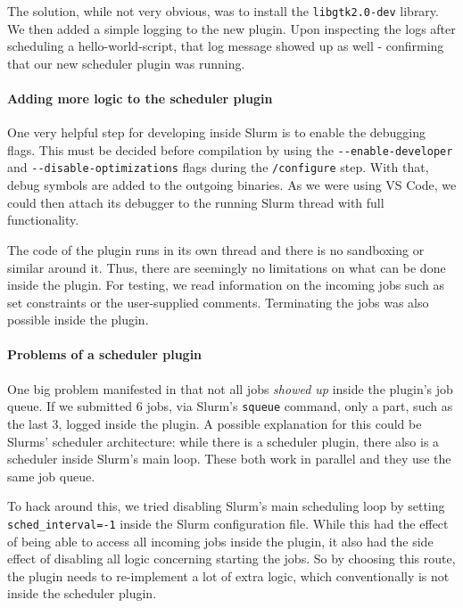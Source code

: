 The solution, while not very obvious, was to install the \verb|libgtk2.0-dev| library.
We then added a simple logging to the new plugin. Upon inspecting the logs after scheduling a hello-world-script, that log message showed up as well - confirming that our new scheduler plugin was running.

\paragraph{Adding more logic to the scheduler plugin}

One very helpful step for developing inside Slurm is to enable the debugging flags.
This must be decided before compilation by using the \verb|--enable-developer| and \verb|--disable-optimizations| flags during the \verb|/configure| step. 
With that, debug symbols are added to the outgoing binaries. 
As we were using VS Code, we could then attach its debugger to the running Slurm thread with full functionality.

The code of the plugin runs in its own thread and there is no sandboxing or similar around it.
Thus, there are seemingly no limitations on what can be done inside the plugin. 
For testing, we read information on the incoming jobs such as set constraints or the user-supplied comments. Terminating the jobs was also possible inside the plugin.

\paragraph{Problems of a scheduler plugin}

One big problem manifested in that not all jobs \emph{showed up} inside the plugin's job queue. 
If we submitted 6 jobs, via Slurm's \verb|squeue| command, only a part, such as the last 3, logged inside the plugin.
A possible explanation for this could be Slurms' scheduler architecture: while there is a scheduler plugin, there also is a scheduler inside Slurm's main loop. These both work in parallel and they use the same job queue.

To hack around this, we tried disabling Slurm's main scheduling loop by setting \verb|sched_interval=-1| inside the Slurm configuration file. 
While this had the effect of being able to access all incoming jobs inside the plugin, it also had the side effect of disabling all logic concerning starting the jobs.
So by choosing this route, the plugin needs to re-implement a lot of extra logic, which conventionally is not inside the scheduler plugin. 

